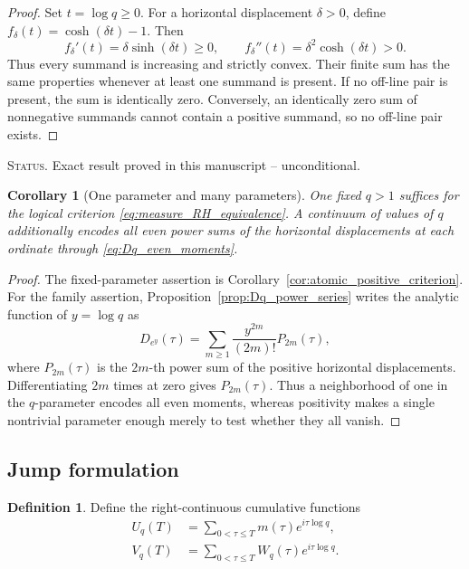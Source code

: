 \documentclass[11pt]{amsart}
\numberwithin{equation}{section}
\theoremstyle{plain}
\newtheorem{corollary}[theorem]{Corollary}
\theoremstyle{definition}
\newtheorem{definition}[theorem]{Definition}
\theoremstyle{remark}
\newcommand{\1}{\mathbf{1}}
\newcommand{\statusnote}[1]{%
  \par\smallskip\noindent
  \begingroup\footnotesize\textsc{Status.} #1\endgroup
  \par\smallskip}
\begin{document}
\begin{proof}
Set \(t=\log q\geq0\).  For a horizontal displacement \(\delta>0\),
define \(f_\delta(t)=\cosh(\delta t)-1\).  Then
\begin{equation}
f_\delta'(t)=\delta\sinh(\delta t)\geq0,
\qquad
f_\delta''(t)=\delta^2\cosh(\delta t)>0.
\label{eq:Dq_monotonicity_derivatives_detailed}
\end{equation}
Thus every summand is increasing and strictly convex.  Their finite sum has
the same properties whenever at least one summand is present.  If no
off-line pair is present, the sum is identically zero.  Conversely, an
identically zero sum of nonnegative summands cannot contain a positive
summand, so no off-line pair exists.
\end{proof}

\statusnote{Exact result proved in this manuscript -- unconditional.}
\begin{corollary}[One parameter and many parameters]
\label{cor:one_many_q}
One fixed $q>1$ suffices for the logical criterion
\eqref{eq:measure_RH_equivalence}.  A continuum of values of $q$ additionally
encodes all even power sums of the horizontal displacements at each
ordinate through \eqref{eq:Dq_even_moments}.
\end{corollary}

\begin{proof}
The fixed-parameter assertion is Corollary~\ref{cor:atomic_positive_criterion}.
For the family assertion, Proposition~\ref{prop:Dq_power_series} writes the
analytic function of \(y=\log q\) as
\begin{equation}
D_{e^y}(\tau)
=
\sum_{m\geq1}\frac{y^{2m}}{(2m)!}P_{2m}(\tau),
\label{eq:one_many_q_generating_function}
\end{equation}
where \(P_{2m}(\tau)\) is the \(2m\)-th power sum of the positive
horizontal displacements.  Differentiating \(2m\) times at zero gives
\(P_{2m}(\tau)\).  Thus a neighborhood of one in the \(q\)-parameter
encodes all even moments, whereas positivity makes a single nontrivial
parameter enough merely to test whether they all vanish.
\end{proof}

\subsection{Jump formulation}
\label{subsec:jump_formulation}

\begin{definition}
\label{def:cumulative_complete_walks}
Define the right-continuous cumulative functions
\begin{align}
U_q(T)
&=
\sum_{0<\tau\leq T}m(\tau)e^{i\tau\log q},
\label{eq:Uq_cumulative}
\\
V_q(T)
&=
\sum_{0<\tau\leq T}W_q(\tau)e^{i\tau\log q}.
\label{eq:Vq_cumulative}
\end{align}
\end{definition}
\end{document}
